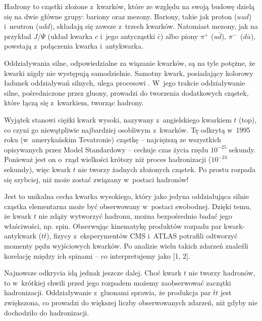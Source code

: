 

\normalsize
\aktspis{}
\akthead


Hadrony to cząstki złożone z~kwarków, które ze względu na swoją budowę dzielą się na dwie główne grupy: bariony oraz mezony. Bariony, takie jak proton ($uud$) i~neutron ($udd$), składają się zawsze z~trzech kwarków. Natomiast mezony, jak na przykład $J/\Psi$ (układ kwarka $c$ i~jego antycząstki $\bar{c}$) albo piony $\pi^+$ ($u\bar{d}$), $\pi^-$~($d\bar{u}$), powstają z~połączenia kwarka i~antykwarka.



Oddziaływania silne, odpowiedzialne za wiązanie kwarków, są na tyle potężne, że kwarki nigdy nie występują samodzielnie. Samotny kwark, posiadający kolorowy ładunek oddziaływań silnych, ulega procesowi . W~jego trakcie oddziaływanie silne, pośredniczone przez gluony, prowadzi do tworzenia dodatkowych cząstek, które łączą się z~kwarkiem, tworząc hadrony.

Wyjątek stanowi ciężki kwark %
wysoki, nazywany z~angielskiego kwarkiem $t$ (top), co czyni go niewątpliwie najbardziej osobliwym z~kwarków. Tę odkrytą w~1995 roku (w~amerykańskim Tevatronie) cząstkę -- najcięższą ze wszystkich opisywanych przez Model Standardowy -- cechuje czas życia rzędu $10^{-25}$ sekundy. Ponieważ jest on o~rząd wielkości krótszy niż proces hadronizacji ($10^{-24}$ sekundy), więc kwark $t$ nie tworzy żadnych złożonych cząstek. Po prostu rozpada się szybciej, niż może zostać związany w~postaci hadronów!

Jest to unikalna cecha kwarka wysokiego, który jako jedyna oddziałująca silnie cząstka elementarna może być obserwowany w~postaci swobodnej. Dzięki temu, że kwark $t$ nie zdąży wytworzyć hadronu, można bezpośrednio badać jego właściwości, np. spin. Obserwując kinematykę produktów rozpadu par kwark-antykwark ($t\bar{t}$), fizycy z~eksperymentów CMS i~ATLAS potrafili odtworzyć momenty pędu wyjściowych kwarków. Po analizie wielu takich zdarzeń znaleźli korelację między ich spinami -- co interpretujemy jako  [1, 2].

Najnowsze odkrycia idą jednak jeszcze dalej. Choć kwark $t$ nie tworzy hadronów, to w~krótkiej chwili przed jego rozpadem możemy zaobserwować zaczątki hadronizacji. Oddziaływanie z~gluonami sprawia, że produkcja par $\bar{t}t$ jest zwiększona, co prowadzi do większej liczby obserwowanych zdarzeń, niż gdyby nie dochodziło do hadronizacji.

